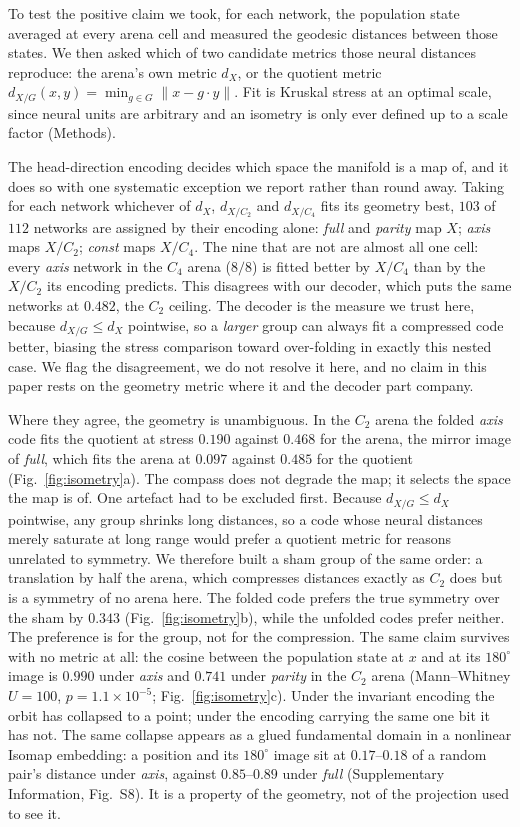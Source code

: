 To test the positive claim we took, for each network, the population state averaged at every arena cell
and measured the geodesic distances between those states. We then asked which of two candidate metrics
those neural distances reproduce: the arena's own metric $d_X$, or the quotient metric
$d_{X/G}(x,y) = \min_{g \in G} \lVert x - g\!\cdot\!y \rVert$. Fit is Kruskal stress at an optimal scale,
since neural units are arbitrary and an isometry is only ever defined up to a scale factor (Methods).

The head-direction encoding decides which space the manifold is a map of, and it does so with one
systematic exception we report rather than round away. Taking for each network whichever of $d_X$,
$d_{X/C_2}$ and $d_{X/C_4}$ fits its geometry best, $103$ of $112$ networks are assigned by their
encoding alone: \textit{full} and \textit{parity} map $X$; \textit{axis} maps $X/C_2$; \textit{const}
maps $X/C_4$. The nine that are not are almost all one cell: every \textit{axis} network in the $C_4$
arena ($8/8$) is fitted better by $X/C_4$ than by the $X/C_2$ its encoding predicts. This disagrees
with our decoder, which puts the same networks at $0.482$, the $C_2$ ceiling. The decoder is the
measure we trust here, because $d_{X/G} \le d_X$ pointwise, so a \emph{larger} group can always fit a
compressed code better, biasing the stress comparison toward over-folding in exactly this nested case.
We flag the disagreement, we do not resolve it here, and no claim in this paper rests on the geometry
metric where it and the decoder part company.

Where they agree, the geometry is unambiguous. In the $C_2$ arena the folded \textit{axis} code fits
the quotient at stress $0.190$ against $0.468$ for the arena, the mirror image of \textit{full}, which
fits the arena at $0.097$ against $0.485$ for the quotient (Fig.~\ref{fig:isometry}a). The compass does
not degrade the map; it selects the space the map is of. One artefact had to be excluded first. Because
$d_{X/G} \le d_X$ pointwise, any group shrinks long distances, so a code whose neural distances merely
saturate at long range would prefer a quotient metric for reasons unrelated to symmetry. We therefore
built a sham group of the same order: a translation by half the arena, which compresses distances
exactly as $C_2$ does but is a symmetry of no arena here. The folded code prefers the true symmetry
over the sham by $0.343$ (Fig.~\ref{fig:isometry}b), while the unfolded codes prefer neither. The
preference is for the group, not for the compression. The same claim survives with no metric at all:
the cosine between the population state at $x$ and at its $180^\circ$ image is $0.990$ under
\textit{axis} and $0.741$ under \textit{parity} in the $C_2$ arena (Mann--Whitney $U = 100$,
$p = 1.1\times10^{-5}$; Fig.~\ref{fig:isometry}c). Under the invariant encoding the orbit has collapsed
to a point; under the encoding carrying the same one bit it has not. The same collapse appears as a
glued fundamental domain in a nonlinear Isomap embedding: a position and its $180^\circ$ image sit
at $0.17$--$0.18$ of a random pair's distance under \textit{axis}, against $0.85$--$0.89$ under
\textit{full} (Supplementary Information, Fig.~S8). It is a property of the geometry, not of the
projection used to see it.


